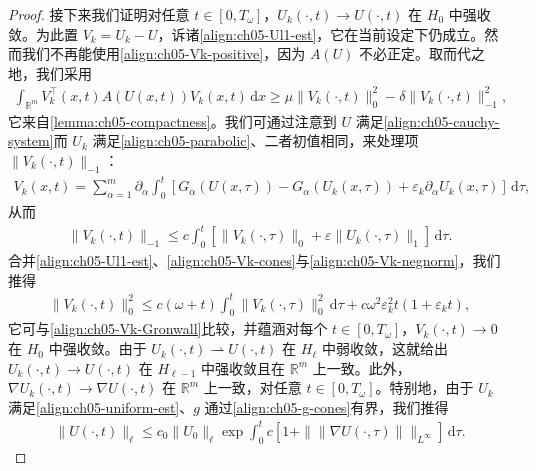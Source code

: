\documentclass[../../main.tex]{subfiles}
\begin{document}
\begin{proof}
接下来我们证明对任意 $t\in[0,T_{\omega}]$，$U_{k}(\cdot,t)\to U(\cdot,t)$ 在 $H_{0}$ 中强收敛。为此置 $V_{k}=U_{k}-U$，诉诸\eqref{align:ch05-Ul1-est}，它在当前设定下仍成立。然而我们不再能使用\eqref{align:ch05-Vk-positive}，因为 $A(U)$ 不必正定。取而代之地，我们采用
\begin{align}
\int_{\mathbb{R}^{m}}V_{k}^{\top}(x,t)A(U(x,t))V_{k}(x,t)\,\mathrm{d}x\geqslant\mu\|V_{k}(\cdot,t)\|_{0}^{2}-\delta\|V_{k}(\cdot,t)\|_{-1}^{2},\label{align:ch05-Vk-cones}
\end{align}
它来自\cref{lemma:ch05-compactness}。我们可通过注意到 $U$ 满足\eqref{align:ch05-cauchy-system}而 $U_{k}$ 满足\eqref{align:ch05-parabolic}、二者初值相同，来处理项 $\|V_{k}(\cdot,t)\|_{-1}$：
\begin{align}
V_{k}(x,t)=\sum_{\alpha=1}^{m}\partial_{\alpha}\int_{0}^{t}[G_{\alpha}(U(x,\tau))-G_{\alpha}(U_{k}(x,\tau))+\varepsilon_{k}\partial_{\alpha}U_{k}(x,\tau)]\,\mathrm{d}\tau,\label{align:ch05-Vk-rep}
\end{align}
从而
\begin{align}
\|V_{k}(\cdot,t)\|_{-1}\leqslant c\int_{0}^{t}[\|V_{k}(\cdot,\tau)\|_{0}+\varepsilon\|U_{k}(\cdot,\tau)\|_{1}]\,\mathrm{d}\tau.\label{align:ch05-Vk-negnorm}
\end{align}
合并\eqref{align:ch05-Ul1-est}、\eqref{align:ch05-Vk-cones}与\eqref{align:ch05-Vk-negnorm}，我们推得
\begin{align}
\|V_{k}(\cdot,t)\|_{0}^{2}\leqslant c(\omega+t)\int_{0}^{t}\|V_{k}(\cdot,\tau)\|_{0}^{2}\,\mathrm{d}\tau+c\omega^{2}\varepsilon_{k}^{2}t(1+\varepsilon_{k}t),\label{align:ch05-Vk-Gronwall-cones}
\end{align}
它可与\eqref{align:ch05-Vk-Gronwall}比较，并蕴涵对每个 $t\in[0,T_{\omega}]$，$V_{k}(\cdot,t)\to0$ 在 $H_{0}$ 中强收敛。由于 $U_{k}(\cdot,t)\rightharpoonup U(\cdot,t)$ 在 $H_{\ell}$ 中弱收敛，这就给出 $U_{k}(\cdot,t)\to U(\cdot,t)$ 在 $H_{\ell-1}$ 中强收敛且在 $\mathbb{R}^{m}$ 上一致。此外，$\nabla U_{k}(\cdot,t)\to\nabla U(\cdot,t)$ 在 $\mathbb{R}^{m}$ 上一致，对任意 $t\in[0,T_{\omega}]$。特别地，由于 $U_{k}$ 满足\eqref{align:ch05-uniform-est}、$g$ 通过\eqref{align:ch05-g-cones}有界，我们推得
\begin{align}
\|U(\cdot,t)\|_{\ell}\leqslant c_{0}\|U_{0}\|_{\ell}\exp\int_{0}^{t}c[1+\|\|\nabla U(\cdot,\tau)\|\|_{L^{\infty}}]\,\mathrm{d}\tau.\label{align:ch05-cones-est}
\end{align}


\end{proof}
\end{document}
